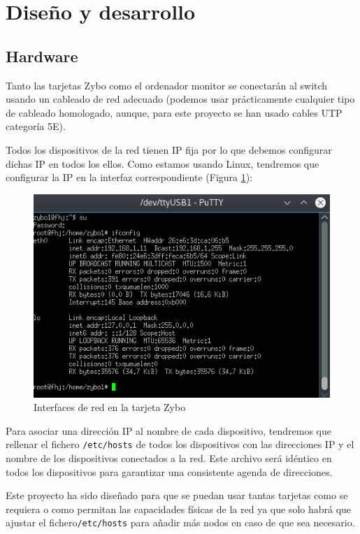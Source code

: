 \section{Diseño y desarrollo}
\subsection{Hardware}
Tanto las tarjetas Zybo como el ordenador monitor se conectarán al switch usando un cableado de red adecuado (podemos usar prácticamente cualquier tipo de cableado homologado, aunque, para este proyecto se han usado cables UTP categoría 5E).

Todos los dispositivos de la red tienen IP fija por lo que debemos configurar dichas IP en todos los ellos. Como estamos usando Linux, tendremos que configurar la IP en la interfaz correspondiente (Figura \ref{Interfaces de red en la tarjeta Zybo}):

\begin{figure}[h]
	\centering
	\includegraphics[scale=0.8]{Anexos/Anexo2/Infraestructura/ifconfigZybo.png}
	\caption{Interfaces de red en la tarjeta Zybo}
	\label{Interfaces de red en la tarjeta Zybo}
\end{figure}

Para asociar una dirección IP al nombre de cada dispositivo, tendremos que rellenar el fichero \texttt{/etc/hosts} de todos los dispositivos con las direcciones IP y el nombre de los dispositivos conectados a la red. Este archivo será idéntico en todos los dispositivos para garantizar una consistente agenda de direcciones.

Este proyecto ha sido diseñado para que se puedan usar tantas tarjetas como se requiera o como permitan las capacidades físicas de la red ya que solo habrá que ajustar el fichero\texttt{/etc/hosts} para añadir más nodos en caso de que sea necesario.

